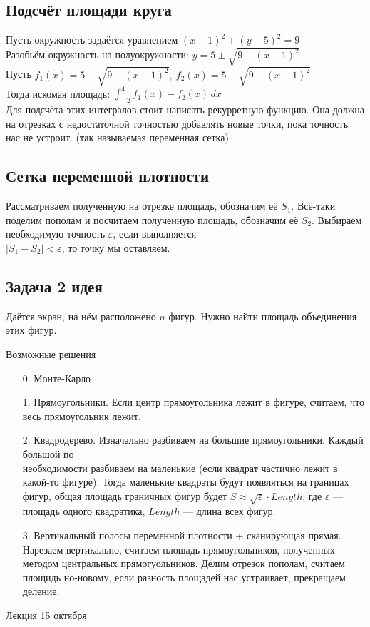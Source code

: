 \documentclass[12pt, a4paper]{article}
\begin{document}
    \subsection*{Подсчёт площади круга}
    Пусть окружность задаётся уравнением $(x - 1)^2 + (y - 5)^2 = 9$\\
    Разобьём окружность на полуокружности: $y = 5 \pm \sqrt{9 - (x - 1)^2}$\\
    Пусть $f_1(x) = 5 + \sqrt{9 - (x - 1)^2},\ f_2(x) = 5 - \sqrt{9 - (x - 1)^2}$\\
    Тогда искомая площадь: $\displaystyle \int_{-2}^4 f_1(x) - f_2(x)\, dx$\\
    Для подсчёта этих интегралов стоит написать рекурретную функцию. Она должна на отрезках с недостаточной точностью добавлять новые точки, пока точность нас не устроит. (так называемая переменная сетка).
    \subsection*{Сетка переменной плотности}
    Рассматриваем полученную на отрезке площадь, обозначим её $S_1$. Всё-таки поделим пополам и посчитаем полученную площадь, обозначим её $S_2$. Выбираем необходимую точность $\varepsilon$, если выполняется\\
    $|S_1 - S_2| < \varepsilon$, то точку мы оставляем.
    \subsection*{Задача 2 идея}
    Даётся экран, на нём расположено $n$ фигур. Нужно найти площадь объединения этих фигур.\\
    \begin{center}
        Возможные решения
    \end{center}
    \begin{enumerate}
        \item[0.] Монте-Карло
        \item[1.] Прямоугольники. Если центр прямоугольника лежит в фигуре, считаем, что весь прямоугольник лежит.
        \item[2.] Квадродерево. Изначально разбиваем на большие прямоугольники. Каждый большой по\\необходимости разбиваем на маленькие (если квадрат частично лежит в какой-то фигуре). Тогда маленькие квадраты будут появляться на границах фигур, общая площадь граничных фигур будет $S \approx \sqrt{\varepsilon}\cdot Length$, где $\varepsilon$ --- площадь одного квадратика, $Length$ --- длина всех фигур.
        \item[3.] Вертикальный полосы переменной плотности + сканирующая прямая. Нарезаем вертикально, считаем площадь прямоугольников, полученных методом центральных прямогуольников. Делим отрезок пополам, считаем площидь но-новому, если разность площадей нас устраивает, прекращаем деление.
    \end{enumerate}
    \begin{center}
        Лекция 15 октября
    \end{center}
\end{document}
